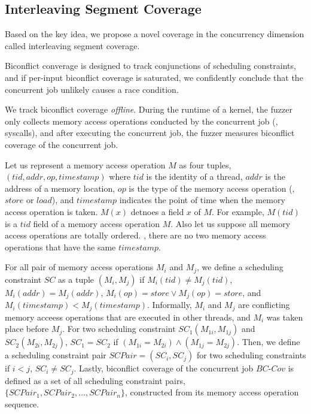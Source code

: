 \subsection{Interleaving Segment Coverage}
\label{ss:coverage}

Based on the key idea, we propose a novel coverage in the concurrency
dimension called interleaving segment coverage.
%



\newcommand{\mutable}{mutable edge\xspace}
\newcommand{\mutables}{mutable edges\xspace}
\newcommand{\immutable}{immutable edge\xspace}
\newcommand{\immutables}{immutable edges\xspace}
%
Biconflict converage is designed to track conjunctions of scheduling
constraints, and if per-input biconflict coverage is saturated, we
confidently conclude that the concurrent job unlikely causes a race
condition.

We track biconflict coverage \textit{offline}. During the runtime of a
kernel, the fuzzer only collects memory access operations conducted by
the concurrent job (\eg, syscalls), and after executing the concurrent
job, the fuzzer measures biconflict coverage of the concurrent job.

%
Let us represent a memory access operation $M$ as four tuples,
$(tid, addr, op, timestamp)$ where $tid$ is the identity of a thread,
$addr$ is the address of a memory location, $op$ is the type of the
memory access operation (\ie, $store$ or $load$), and $timestamp$
indicates the point of time when the memory access operation is taken.
%
$M(x)$ detnoes a field $x$ of $M$. For example, $M(tid)$ is a $tid$
field of a memory access operation $M$.
%
Also let us suppose all memory access operations are totally
ordered. \ie, there are no two memory access operations that have the
same $timestamp$.

For all pair of memory access operations $M_i$ and $M_j$, we define a
scheduling constraint $SC$ as a tuple $(M_i, M_j)$ if
$M_i(tid) \neq M_j(tid)$, $M_i(addr) = M_j(addr)$,
$M_i(op) = store \vee M_j(op) = store$, and
$M_i(timestamp) < M_j(timestamp)$.
%
Informally, $M_i$ and $M_j$ are conflicting memory acceess operations
that are executed in other threads, and $M_i$ was taken place before
$M_j$.
%
For two scheduling constraint $SC_1(M_{1i}, M_{1j})$ and
$SC_2(M_{2i}, M_{2j})$, $SC_1 = SC_2$ if
$(M_{1i} = M_{2i}) \wedge (M_{1j} = M_{2j})$.
%
Then, we define a scheduling constraint pair $SCPair = (SC_i, SC_j)$
for two scheduling constraints if $i < j$, $SC_i \neq SC_j$.
%
Lastly, biconflict coverage of the concurrent job $BC\mbox{-}Cov$ is
defined as a set of all scheduling constraint pairs,
$\{SCPair_1, SCPair_2, ..., SCPair_n\}$, constructed from its memory
access operation sequence.



